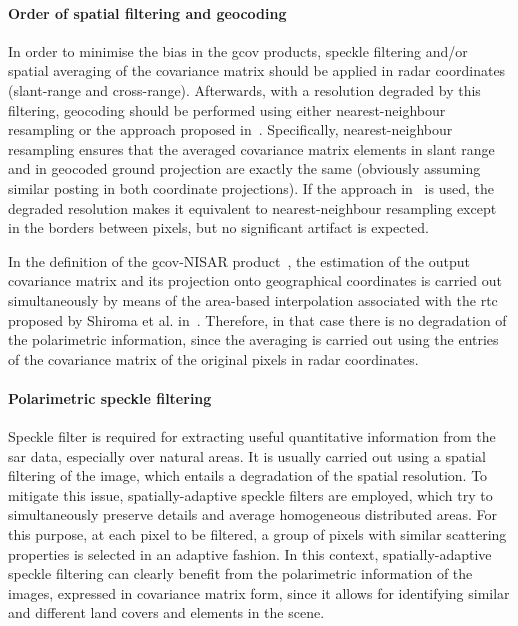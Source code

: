 \paragraph*{Order of spatial filtering and geocoding}
\label{p:order_pol}

In order to minimise the bias in the \acs{gcov} products, speckle filtering and/or spatial averaging of the covariance matrix should be applied in radar coordinates (slant-range and cross-range). Afterwards, with a resolution degraded by this filtering, geocoding should be performed using either nearest-neighbour resampling or the approach proposed in~\cite{Shiroma2022}. Specifically, nearest-neighbour resampling ensures that the averaged covariance
matrix elements in slant range and in geocoded ground projection are exactly the same (obviously assuming similar posting in both coordinate projections). If the approach in~\cite{Shiroma2022} is used, the degraded resolution makes it equivalent to nearest-neighbour resampling except in the borders between pixels, but no significant artifact is expected.

In the definition of the \acs{gcov}-NISAR product~\cite{NISAR_GCOV_ProdSpec}, the estimation of the output covariance matrix and its projection onto geographical coordinates is carried out simultaneously by means of the area-based interpolation associated with the \acs{rtc} proposed by Shiroma et al. in~\cite{Shiroma2022}. Therefore, in that case there is no degradation of the polarimetric information, since the averaging is carried out using the entries of the covariance matrix of the original pixels in radar coordinates.

\paragraph*{Polarimetric speckle filtering}

Speckle filter is required for extracting useful quantitative information from the \acs{sar} data, especially over natural areas. It is usually carried out using a spatial filtering of the image, which entails a degradation of the spatial resolution. To mitigate this issue, spatially-adaptive speckle filters are employed, which try to simultaneously preserve details and average homogeneous distributed areas. For this purpose, at each pixel to be filtered, a group of pixels with similar scattering properties is selected in an adaptive fashion. In this context, spatially-adaptive speckle filtering can clearly benefit from the polarimetric information of the images, expressed in covariance matrix form, since it allows for identifying similar and different land covers and elements in the scene. 

